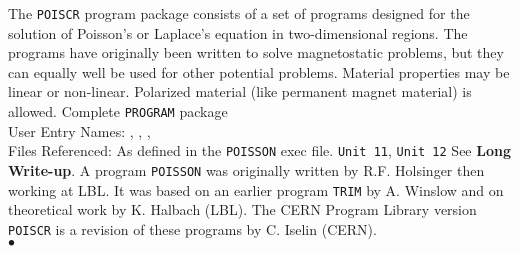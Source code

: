                     
                  
\Submitter{}                         
                   
The {\tt POISCR} program package consists of a set of programs designed
for the solution of Poisson's or Laplace's equation in two-dimensional
regions. The programs have originally been written to solve
magnetostatic problems, but they can equally well be used for other
potential problems. Material properties may be linear or non-linear.
Polarized material (like permanent magnet material) is allowed.
\Structure
Complete {\tt PROGRAM} package \\
User Entry Names: , , ,
 \\
Files Referenced: As defined in the {\tt POISSON} exec file.
{\tt Unit 11}, {\tt Unit 12}
\Usage
See {\bf Long Write-up}.
\Source
A program {\tt POISSON} was originally written by R.F. Holsinger then
working at LBL. It was based on an earlier program {\tt TRIM} by A.
Winslow and on theoretical work by K. Halbach (LBL). The CERN Program
Library version {\tt POISCR} is a revision of these programs by C.
Iselin (CERN).
\\ $\bullet$
